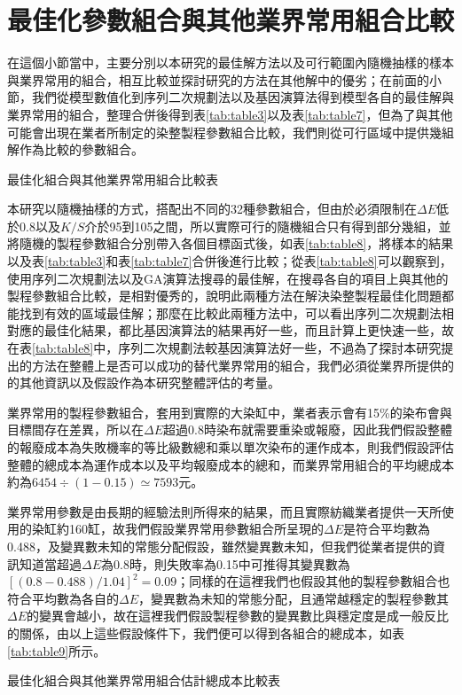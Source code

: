 \section{最佳化參數組合與其他業界常用組合比較}
\label{c:ch6.4}
在這個小節當中，主要分別以本研究的最佳解方法以及可行範圍內隨機抽樣的樣本與業界常用的組合，相互比較並探討研究的方法在其他解中的優劣；在前面的小節，我們從模型數值化到序列二次規劃法以及基因演算法得到模型各自的最佳解與業界常用的組合，整理合併後得到表\ref{tab:table3}以及表\ref{tab:table7}，但為了與其他可能會出現在業者所制定的染整製程參數組合比較，我們則從可行區域中提供幾組解作為比較的參數組合。
\begin{table}[!htbp]
	\caption{最佳化組合與其他業界常用組合比較表}
	\center
	
	\label{tab:table8}
\end{table}

本研究以隨機抽樣的方式，搭配出不同的32種參數組合，但由於必須限制在$\Delta E$低於0.8以及$K/S$介於95到105之間，所以實際可行的隨機組合只有得到部分幾組，並將隨機的製程參數組合分別帶入各個目標函式後，如表\ref{tab:table8}，將樣本的結果以及表\ref{tab:table3}和表\ref{tab:table7}合併後進行比較；從表\ref{tab:table8}可以觀察到，使用序列二次規劃法以及GA演算法搜尋的最佳解，在搜尋各自的項目上與其他的製程參數組合比較，是相對優秀的，說明此兩種方法在解決染整製程最佳化問題都能找到有效的區域最佳解；那麼在比較此兩種方法中，可以看出序列二次規劃法相對應的最佳化結果，都比基因演算法的結果再好一些，而且計算上更快速一些，故在表\ref{tab:table8}中，序列二次規劃法較基因演算法好一些，不過為了探討本研究提出的方法在整體上是否可以成功的替代業界常用的組合，我們必須從業界所提供的的其他資訊以及假設作為本研究整體評估的考量。

業界常用的製程參數組合，套用到實際的大染缸中，業者表示會有15\%的染布會與目標間存在差異，所以在$\Delta E$超過0.8時染布就需要重染或報廢，因此我們假設整體的報廢成本為失敗機率的等比級數總和乘以單次染布的運作成本，則我們假設評估整體的總成本為運作成本以及平均報廢成本的總和，而業界常用組合的平均總成本約為$6454\div (1-0.15)\simeq 7593$元。

業界常用參數是由長期的經驗法則所得來的結果，而且實際紡織業者提供一天所使用的染缸約160缸，故我們假設業界常用參數組合所呈現的$\Delta E$是符合平均數為0.488，及變異數未知的常態分配假設，雖然變異數未知，但我們從業者提供的資訊知道當超過$\Delta E$為0.8時，則失敗率為0.15中可推得其變異數為$[(0.8-0.488)/1.04]^2 = 0.09$；同樣的在這裡我們也假設其他的製程參數組合也符合平均數為各自的$\Delta E$，變異數為未知的常態分配，且通常越穩定的製程參數其$\Delta E$的變異會越小，故在這裡我們假設製程參數的變異數比與穩定度是成一般反比的關係，由以上這些假設條件下，我們便可以得到各組合的總成本，如表\ref{tab:table9}所示。
\newpage
\begin{table}
	\caption{最佳化組合與其他業界常用組合估計總成本比較表}
	\center
	
	\label{tab:table9}
\end{table}

